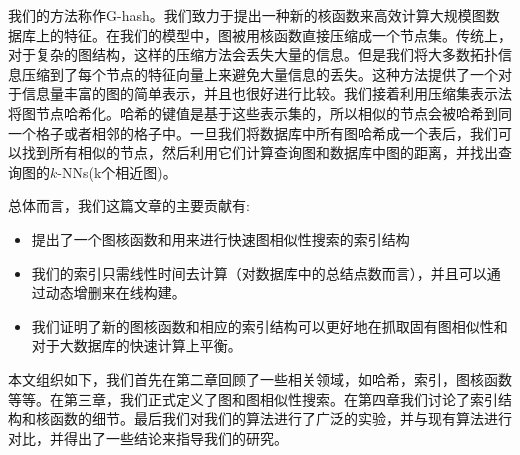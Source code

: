 \documentclass{article}
\begin{document}
我们的方法称作G-hash。我们致力于提出一种新的核函数来高效计算大规模图数据库上的特征。在我们的模型中，图被用核函数直接压缩成一个节点集。传统上，对于复杂的图结构，这样的压缩方法会丢失大量的信息。但是我们将大多数拓扑信息压缩到了每个节点的特征向量上来避免大量信息的丢失。这种方法提供了一个对于信息量丰富的图的简单表示，并且也很好进行比较。我们接着利用压缩集表示法将图节点哈希化。哈希的键值是基于这些表示集的，所以相似的节点会被哈希到同一个格子或者相邻的格子中。一旦我们将数据库中所有图哈希成一个表后，我们可以找到所有相似的节点，然后利用它们计算查询图和数据库中图的距离，并找出查询图的$k$-NNs(k个相近图)。

总体而言，我们这篇文章的主要贡献有:
\begin{itemize}
    \item 提出了一个图核函数和用来进行快速图相似性搜索的索引结构
    \item 我们的索引只需线性时间去计算（对数据库中的总结点数而言），并且可以通过动态增删来在线构建。
    \item 我们证明了新的图核函数和相应的索引结构可以更好地在抓取固有图相似性和对于大数据库的快速计算上平衡。
\end{itemize}
本文组织如下，我们首先在第二章回顾了一些相关领域，如哈希，索引，图核函数等等。在第三章，我们正式定义了图和图相似性搜索。在第四章我们讨论了索引结构和核函数的细节。最后我们对我们的算法进行了广泛的实验，并与现有算法进行对比，并得出了一些结论来指导我们的研究。




\ifx\allfiles\undefined
%
%
\end{document}
